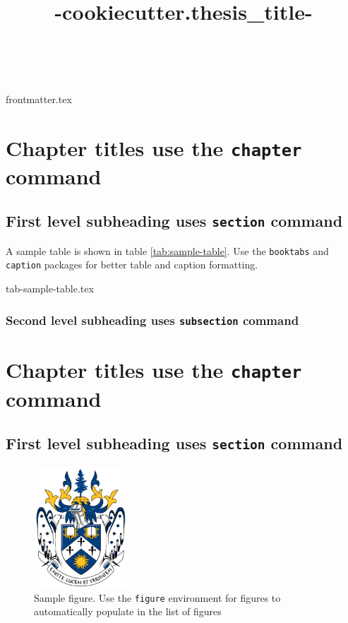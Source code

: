 \documentclass[openany, 12pt]{book}
\title{ {{-cookiecutter.thesis_title-}} }
\author{\givenname\ \surname}
\begin{document}
{frontmatter.tex}

\chapter{Chapter titles use the \texttt{chapter} command}

\section{First level subheading uses \texttt{section} command}

A sample table is shown in table \ref{tab:sample-table}.
Use the \texttt{booktabs} and \texttt{caption} packages for better table and caption formatting.

\begin{table}
    \centering
    \caption{Sample table which will automatically update in List of Tables}
    \label{tab:sample-table}
    {tab-sample-table.tex}
\end{table}

\subsection{Second level subheading uses \texttt{subsection} command}

\chapter{Chapter titles use the \texttt{chapter} command}

\section{First level subheading uses \texttt{section} command}

\begin{figure}
    \centering
    \includegraphics[width=3.5cm]{laurentian-university-coa.png}
    \caption{Sample figure. Use the \texttt{figure} environment for figures to automatically populate in the list of figures}
\end{figure}
\end{document}
